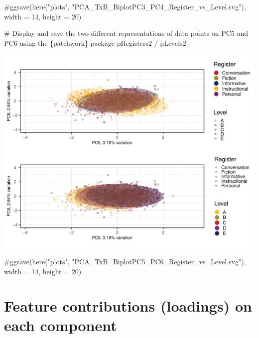 \documentclass[
  letterpaper,
  DIV=11,
  numbers=noendperiod]{scrreprt}
\newenvironment{Shaded}{\begin{snugshade}}{\end{snugshade}}
\newcommand{\CommentTok}[1]{\textcolor[rgb]{0.37,0.37,0.37}{#1}}
\newcommand{\NormalTok}[1]{\textcolor[rgb]{0.00,0.23,0.31}{#1}}
\newcommand{\SpecialCharTok}[1]{\textcolor[rgb]{0.37,0.37,0.37}{#1}}
\begin{document}
\begin{Shaded}
\begin{Highlighting}[]
\CommentTok{\#ggsave(here("plots", "PCA\_TxB\_BiplotPC3\_PC4\_Register\_vs\_Level.svg"), width = 14, height = 20)}

\CommentTok{\# Display and save the two different representations of data points on PC5 and PC6 using the \{patchwork\} package }
\NormalTok{pRegisters2 }\SpecialCharTok{/}\NormalTok{ pLevels2}
\end{Highlighting}
\end{Shaded}

\includegraphics{AppendixF_files/figure-pdf/PCAtools-biplots-TxB-Levels-2.pdf}

\begin{Shaded}
\begin{Highlighting}[]
\CommentTok{\#ggsave(here("plots", "PCA\_TxB\_BiplotPC5\_PC6\_Register\_vs\_Level.svg"), width = 14, height = 20)}
\end{Highlighting}
\end{Shaded}

\section{Feature contributions (loadings) on each
component}\label{feature-contributions-loadings-on-each-component}
\end{document}
